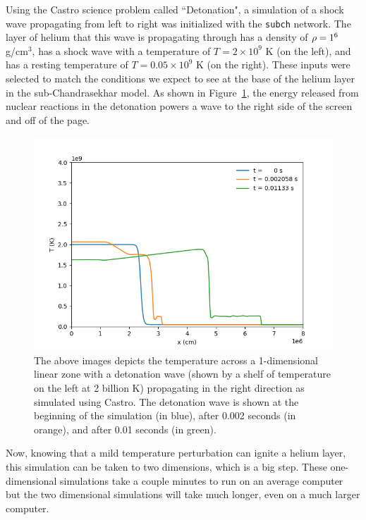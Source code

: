 \documentclass[preprint]{aastex62}
\begin{document}
      Using the Castro science problem called ``Detonation", a simulation of a shock wave propagating from left to right was initialized with the {\tt subch} network. The layer of helium that this wave is propagating through has a density of $\rho = 1 \time 10^6$ g/cm$^3$, has a shock wave with a temperature of $T = 2 \times 10^9$ K (on the left), and has a resting temperature of $T = 0.05 \times 10^9$ K (on the right). These inputs were selected to match the conditions we expect to see at the base of the helium layer in the sub-Chandrasekhar model. As shown in Figure~\ref{fig:detonation}, the energy released from nuclear reactions in the detonation powers a wave to the right side of the screen and off of the page. 
      
    \begin{figure}
      \centering
      \includegraphics[width=5in]{images/flame-thesis}
      \caption{The above images depicts the temperature across a 1-dimensional linear zone with a detonation wave (shown by a shelf of temperature on the left at 2 billion K) propagating in the right direction as simulated using Castro. The detonation wave is shown at the beginning of the simulation (in blue), after 0.002 seconds (in orange), and after 0.01 seconds (in green).}
      \label{fig:detonation}
    \end{figure}
      
      Now, knowing that a mild temperature perturbation can ignite a helium layer, this simulation can be taken to two dimensions, which is a big step. These one-dimensional simulations take a couple minutes to run on an average computer but the two dimensional simulations will take much longer, even on a much larger computer. 
      
\end{document}
